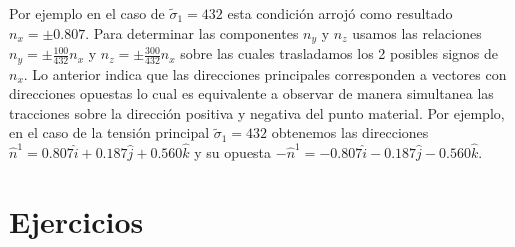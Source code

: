 \documentclass[../notas medios.tex]{subfiles}
\begin{document}
Por ejemplo en el caso de ${{\tilde \sigma }_1} = 432$ esta condición arrojó como resultado ${n_x} =  \pm 0.807$. Para determinar las componentes ${n_y}$ y ${n_z}$ usamos las relaciones ${n_y} = \pm \frac{{100}}{{432}}{n_x}$ y ${n_z} = \pm \frac{{300}}{{432}}{n_x}$ sobre las cuales trasladamos los 2 posibles signos de ${n_x}$. Lo anterior indica que las direcciones principales corresponden a vectores con direcciones opuestas lo cual es equivalente a observar de manera simultanea las tracciones sobre la dirección positiva y negativa del punto material. Por ejemplo, en el caso de la tensión principal ${{\tilde \sigma }_1} = 432$ obtenemos las direcciones ${{\hat n}^1} = 0.807\hat i + 0.187\hat j + 0.560\hat k$ y su opuesta ${{-\hat n}^1} = -0.807\hat i - 0.187\hat j - 0.560\hat k$.


\section*{Ejercicios}
\end{document}
